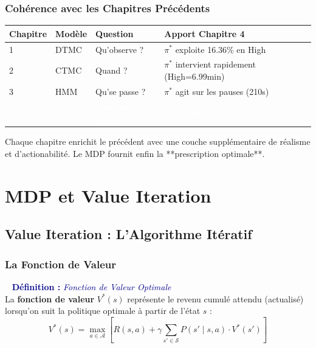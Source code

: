 \documentclass[11pt,a4paper]{article}
\renewcommand{\arraystretch}{1.35}
\newenvironment{defbox}[1]{%
  \vspace{3pt}\begin{framed}
  \noindent{\color{NavyBlue}\rule{0.3cm}{3pt}}~%
  \textcolor{DarkBlue}{\textbf{Définition :} \textit{#1}}\\[3pt]}
  {\end{framed}\vspace{3pt}}
\begin{document}
\subsubsection{Cohérence avec les Chapitres Précédents}
 
\begin{center}
\renewcommand{\arraystretch}{1.5}
\begin{tabular}{l|lll}
\toprule
\textbf{Chapitre} & \textbf{Modèle} & \textbf{Question} & \textbf{Apport Chapitre 4} \\
\midrule
\rowcolor{LightBlue}
1 & DTMC & Qu'observe ? & $\pi^*$ exploite 16.36\% en High \\
\rowcolor{LightOrange}
2 & CTMC & Quand ? & $\pi^*$ intervient rapidement (High=6.99min) \\
\rowcolor{LightRed}
3 & HMM & Qu'se passe ? & $\pi^*$ agit sur les pauses (210s) \\
\rowcolor{DarkBlue}
\textcolor{white}{4} & \textcolor{white}{MDP} & \textcolor{white}{Comment optim.} & \textcolor{white}{pub→Low, promo→Med, rec→High} \\
\bottomrule
\end{tabular}
\end{center}
 
Chaque chapitre enrichit le précédent avec une couche supplémentaire de
réalisme et d'actionabilité. Le MDP fournit enfin la **prescription optimale**.
\newpage

\section{MDP et Value Iteration}


\subsection{Value Iteration : L'Algorithme Itératif}

\subsubsection{La Fonction de Valeur}

\begin{defbox}{Fonction de Valeur Optimale}
La \textbf{fonction de valeur} $V^*(s)$ représente le revenu cumulé attendu (actualisé) lorsqu'on suit la politique optimale à partir de l'état $s$ :
$$V^*(s) = \max_{a \in \mathcal{A}} \left[ R(s,a) + \gamma \sum_{s' \in \mathcal{S}} P(s' \mid s, a) \cdot V^*(s') \right]$$
\end{defbox}
\end{document}
